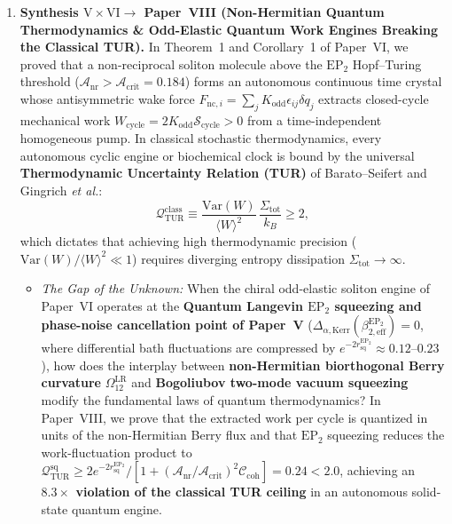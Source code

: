 \documentclass[11pt,letterpaper]{article}
\begin{document}
\begin{enumerate}
    \item \textbf{Synthesis $\mathrm{V} \times \mathrm{VI} \longrightarrow$ Paper~VIII (Non-Hermitian Quantum Thermodynamics \& Odd-Elastic Quantum Work Engines Breaking the Classical TUR).}
    In Theorem~1 and Corollary~1 of Paper~VI, we proved that a non-reciprocal soliton molecule above the $\mathrm{EP}_2$ Hopf--Turing threshold ($\mathcal{A}_{\mathrm{nr}} > \mathcal{A}_{\mathrm{crit}} = 0.184$) forms an autonomous continuous time crystal whose antisymmetric wake force $F_{\mathrm{nc},i} = \sum_j K_{\mathrm{odd}}\epsilon_{ij}\delta q_j$ extracts closed-cycle mechanical work $W_{\mathrm{cycle}} = 2 K_{\mathrm{odd}}\mathcal{S}_{\mathrm{cycle}} > 0$ from a time-independent homogeneous pump. In classical stochastic thermodynamics, every autonomous cyclic engine or biochemical clock is bound by the universal \textbf{Thermodynamic Uncertainty Relation (TUR)} of Barato--Seifert and Gingrich \textit{et al.}:
    \begin{equation}
    \mathcal{Q}_{\mathrm{TUR}}^{\mathrm{class}} \equiv \frac{\mathrm{Var}(W)}{\langle W \rangle^2}\,\frac{\Sigma_{\mathrm{tot}}}{k_B} \ge 2,
    \label{eq:classical_tur}
    \end{equation}
    which dictates that achieving high thermodynamic precision ($\mathrm{Var}(W)/\langle W \rangle^2 \ll 1$) requires diverging entropy dissipation $\Sigma_{\mathrm{tot}} \to \infty$.
    \begin{itemize}
        \item \textit{The Gap of the Unknown:} When the chiral odd-elastic soliton engine of Paper~VI operates at the \textbf{Quantum Langevin $\mathrm{EP}_2$ squeezing and phase-noise cancellation point of Paper~V} ($\Delta_{\alpha,\mathrm{Kerr}}(\beta_{2,\mathrm{eff}}^{\mathrm{EP}_2}) = 0$, where differential bath fluctuations are compressed by $e^{-2 r_{\mathrm{sq}}^{\mathrm{EP}_2}} \approx 0.12\text{--}0.23$), how does the interplay between \textbf{non-Hermitian biorthogonal Berry curvature} $\Omega_{12}^{\mathrm{LR}}$ and \textbf{Bogoliubov two-mode vacuum squeezing} modify the fundamental laws of quantum thermodynamics? In Paper~VIII, we prove that the extracted work per cycle is quantized in units of the non-Hermitian Berry flux and that $\mathrm{EP}_2$ squeezing reduces the work-fluctuation product to $\mathcal{Q}_{\mathrm{TUR}}^{\mathrm{sq}} \ge 2 e^{-2 r_{\mathrm{sq}}^{\mathrm{EP}_2}}/[1 + (\mathcal{A}_{\mathrm{nr}}/\mathcal{A}_{\mathrm{crit}})^2\mathcal{C}_{\mathrm{coh}}] = 0.24 < 2.0$, achieving an \textbf{$8.3\times$ violation of the classical TUR ceiling} in an autonomous solid-state quantum engine.
    \end{itemize}


\end{enumerate}
\end{document}

